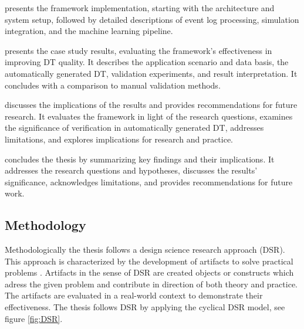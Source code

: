  presents the framework implementation, starting with the architecture and system setup, followed by detailed descriptions of event log processing, simulation integration, and the machine learning pipeline.

 presents the case study results, evaluating the framework's effectiveness in improving DT quality. It describes the application scenario and data basis, the automatically generated DT, validation experiments, and result interpretation. It concludes with a comparison to manual validation methods.

 discusses the implications of the results and provides recommendations for future research. It evaluates the framework in light of the research questions, examines the significance of verification in automatically generated DT, addresses limitations, and explores implications for research and practice.

 concludes the thesis by summarizing key findings and their implications. It addresses the research questions and hypotheses, discusses the results' significance, acknowledges limitations, and provides recommendations for future work.

\subsection*{Methodology}

Methodologically the thesis follows a design science research approach (DSR). This approach is characterized by the development of artifacts to solve practical problems \parencite{hevner2004design,peffers2007design}. Artifacts in the sense of DSR are created objects or constructs which adress the given problem and contribute in direction of both theory and practice. The artifacts are evaluated in a real-world context to demonstrate their effectiveness. The thesis follows DSR by applying the cyclical DSR model, see figure \ref{fig:DSR}.

